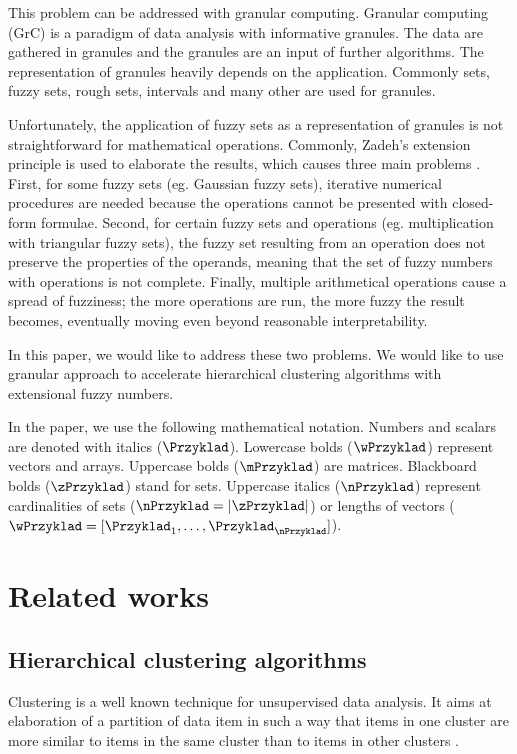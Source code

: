 \documentclass{amcs}
\begin{document}
This problem can be addressed with granular computing. 
Granular computing (GrC) is a paradigm of data analysis with informative granules. 
The data are gathered in granules and the granules are an input of further algorithms. 
The representation of granules heavily depends on the application. 
Commonly sets, fuzzy sets, rough sets, intervals and many other are used for granules. 

Unfortunately, the application of fuzzy sets as a representation of granules is not straightforward  for mathematical operations. 
Commonly, Zadeh's extension principle is used to elaborate the results, which causes three main problems \cite{id:Siminski2026Arithmetic}. 
First, for some fuzzy sets (eg. Gaussian fuzzy sets), iterative numerical procedures are needed because the operations cannot be presented with closed-form formulae. 
Second, for certain fuzzy sets and operations (eg. multiplication with triangular fuzzy sets), the fuzzy set resulting from an operation does not preserve the properties of the operands, meaning that the set of fuzzy numbers with operations is not complete. 
Finally, multiple arithmetical operations cause a spread of fuzziness; the more operations are run, the more fuzzy the result becomes, eventually moving even beyond reasonable interpretability.

In this paper, we would like to address these two problems.
We would like to use granular approach to accelerate hierarchical clustering algorithms with extensional fuzzy numbers.

In the paper, we use the following mathematical notation.
Numbers and scalars are denoted with italics ($\Przyklad$).
Lowercase bolds ($\wPrzyklad$) represent vectors and arrays.
Uppercase bolds ($\mPrzyklad$) are matrices.
Blackboard bolds ($\zPrzyklad$) stand for sets.
Uppercase italics ($\nPrzyklad$) represent cardinalities of sets ($\nPrzyklad = |\zPrzyklad|$) or lengths of vectors ($\wPrzyklad = [\Przyklad_1, \ldots, \Przyklad_\nPrzyklad]$).


\section{Related works}

\subsection{Hierarchical clustering algorithms}

Clustering is a well known technique for unsupervised data analysis.
It aims at elaboration of a partition of data item in such a way that items in one cluster are more similar to items in the same cluster than to items in other clusters \cite{id:fcm-FOR-optimizing,id:clustering-alg-survey}.
\end{document}
